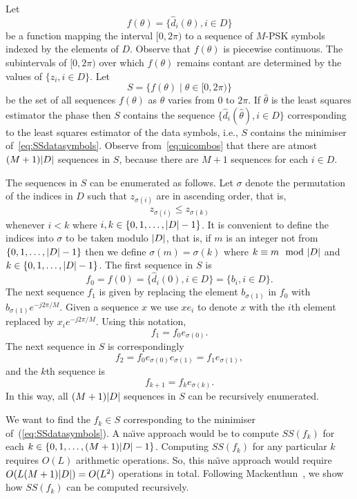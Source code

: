 \documentclass[journal]{IEEEtran}
\begin{document}
Let 
\[
f(\theta) = \{ \hat{d}_i(\theta), i \in D \}
\]
be a function mapping the interval $[0, 2\pi)$ to a sequence of $M$-PSK symbols indexed by the elements of $D$.  Observe that $f(\theta)$ is piecewise continuous.  The subintervals of $[0, 2\pi)$ over which $f(\theta)$ remains contant are determined by the values of $\{z_i, i \in D\}$.  Let
\[
S = \{ f(\theta) \mid \theta \in [0, 2 \pi) \}
\]
be the set of all sequences $f(\theta)$ as $\theta$ varies from $0$ to $2\pi$.  If $\hat{\theta}$ is the least squares estimator the phase then $S$ contains the sequence $\{ \hat{d}_i(\hat{\theta}), i \in D \}$ corresponding to the least squares estimator of the data symbols, i.e., $S$ contains the minimiser of~\eqref{eq:SSdatasymbols}.  Observe from~\eqref{eq:uicombos} that there are atmost $(M+1){\left\vert D \right\vert}$ sequences in $S$, because there are $M+1$ sequences for each $i \in D$.

The sequences in $S$ can be enumerated as follows.  Let $\sigma$ denote the permutation of the indices in $D$ such that $z_{\sigma(i)}$ are in ascending order, that is,
\begin{equation}\label{eq:sigmasortind}
z_{\sigma(i)} \leq z_{\sigma(k)}
\end{equation}
whenever $i < k $ where $i, k \in \{0, 1, \dots, {\left\vert D \right\vert}-1\}$.  It is convenient to define the indices into $\sigma$ to be taken modulo ${\left\vert D \right\vert}$, that is, if $m$ is an integer not from $\{0, 1, \dots, {\left\vert D \right\vert}-1\}$ then we define $\sigma(m) = \sigma(k)$ where $k \equiv m \mod \abs{D}$ and $k \in  \{0, 1, \dots, {\left\vert D \right\vert}-1\}$.  The first sequence in $S$ is 
\[
f_0 = f(0) = \{ \hat{d}_i(0), i \in D \} = \{ b_i, i \in D \}.
\]  
The next sequence $f_1$ is given by replacing the element $b_{\sigma(1)}$ in $f_0$ with $b_{\sigma(1)}e^{-j2\pi/M}$.  Given a sequence $x$ we use $x e_i$ to denote $x$ with the $i$th element replaced by $x_i e^{-j2\pi/M}$.  Using this notation,  
\[
f_1 = f_0 e_{\sigma(0)}.
\] 
The next sequence in $S$ is correspondingly 
\[
f_2 = f_0 e_{\sigma(0)} e_{\sigma(1)} = f_1 e_{\sigma(1)},
\]
and the $k$th sequence is
\begin{equation}\label{eq:fkrec}
f_{k+1} = f_{k} e_{\sigma(k)}.
\end{equation}
In this way, all $(M+1){\left\vert D \right\vert}$ sequences in $S$ can be recursively enumerated.

We want to find the $f_k \in S$ corresponding to the minimiser of~(\ref{eq:SSdatasymbols}).  A na\"{\i}ve approach would be to compute $SS(f_k)$ for each $k \in \{0,1,\dots,(M+1){\left\vert D \right\vert}-1\}$.  Computing $SS(f_k)$ for any particular $k$ requires $O(L)$ arithmetic operations.  So, this na\"{\i}ve approach would require $O(L (M+1) {\left\vert D \right\vert}) = O(L^2)$ operations in total.  Following Mackenthun~\cite{Mackenthun1994}, we show how $SS(f_k)$ can be computed recursively.
\end{document}
